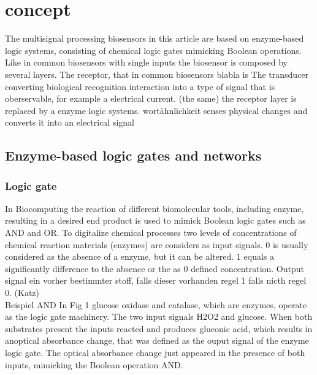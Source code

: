 \documentclass[runningheads]{llncs}
\begin{document}
\section{concept}

The multisignal processing biosensors in this article are based on enzyme-based logic systems, consisting of chemical logic gates mimicking Boolean operations. Like in common biosensors with single inputs the biosensor is composed by several layers. The receptor, that in common biosensors blabla is 
The transducer converting biological recognition interaction into a type of signal that is oberservable, for example a electrical current. (the same) the receptor layer is replaced by a enzyme logic systems. wortähnlichkeit senses physical changes and converts it into an electrical signal

\subsection{Enzyme-based logic gates and networks}
	
	\subsubsection{Logic gate}
	In Biocomputing the reaction of different biomolecular tools, including enzyme, resulting in a desired end product is used to mimick Boolean logic gates such as AND and OR. To digitalize chemical processes two levels of concentrations of chemical reaction materials (enzymes) are considers as input signals. 0 is usually considered as the absence of a enzyme, but it can be altered. 1 equals a  significantly difference to the absence or the as 0 defined concentration. 
	Output signal ein vorher bestimmter stoff, falls dieser vorhanden regel 1 falls nicth regel 0.  
	(Katz) \\
	
	Beispiel AND 
	In Fig 1 glucose oxidase and catalase, which are enzymes, operate as the logic gate machinery. The two input signals H2O2 and glucose. When both substrates present the inputs reacted and produces gluconic acid, which results in anoptical absorbance change, that was defined as the ouput signal of the enzyme logic gate. The optical absorbance change just appeared in the presence of both inputs, mimicking the Boolean operation AND. 
\end{document}
